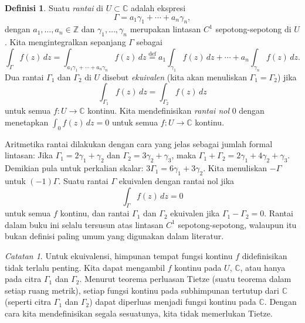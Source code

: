 \documentclass[12pt,openany]{book}
\newcommand{\C}{{\mathbb{C}}}
\newcommand{\Z}{{\mathbb{Z}}}
\newcommand{\myindex}[1]{#1\index{#1}}
\theoremstyle{plain}
\theoremstyle{remark}
\newtheorem{remark}[thm]{Catatan}
\theoremstyle{definition}
\newtheorem{defn}[thm]{Definisi}
\theoremstyle{exercise}
\theoremstyle{example}
\begin{document}
\begin{defn}
Suatu \emph{\myindex{rantai}} di $U \subset \C$ adalah ekspresi
\begin{equation*}
\Gamma = a_1 \gamma_1 + \cdots + a_n \gamma_n ,
\end{equation*}
dengan $a_1,\ldots,a_n \in \Z$ dan $\gamma_1,\ldots,\gamma_n$
merupakan lintasan $C^1$ sepotong-sepotong di $U$.  Kita mengintegralkan sepanjang $\Gamma$ sebagai
%
\begin{equation*}
\int_{\Gamma} f(z) \, dz
=
\int_{a_1 \gamma_1 + \cdots + a_n \gamma_n} f(z) \, dz
\overset{\text{def}}{=}
a_1 \int_{\gamma_1} f(z) \, dz +
\cdots
+
a_n \int_{\gamma_n} f(z) \, dz .
\end{equation*}
Dua rantai $\Gamma_1$ dan $\Gamma_2$ di
$U$ disebut
\emph{ekuivalen} (kita akan menuliskan
%
$\Gamma_1=\Gamma_2$) jika
\begin{equation*}
\int_{\Gamma_1} f(z) \, dz = 
\int_{\Gamma_2} f(z) \, dz
\end{equation*}
untuk semua $f \colon U \to \C$ kontinu.
Kita mendefinisikan \emph{\myindex{rantai nol}} $0$ dengan menetapkan
$\int_0 f(z) \, dz = 0$ untuk semua $f \colon U \to \C$ kontinu.
\end{defn}

Aritmetika rantai dilakukan dengan cara yang jelas sebagai jumlah formal lintasan:
Jika $\Gamma_1 = 2 \gamma_1 + \gamma_2$ dan $\Gamma_2 = 3 \gamma_2 +
\gamma_3$, maka $\Gamma_1 + \Gamma_2 = 2 \gamma_1 + 4 \gamma_2 + \gamma_3$.
Demikian pula untuk perkalian skalar: $3 \Gamma_1 = 6 \gamma_1 + 3 \gamma_2$.
%
Kita menuliskan $-\Gamma$ untuk $(-1)\Gamma$.
Suatu rantai $\Gamma$ ekuivalen dengan rantai nol jika
\begin{equation*}
\int_\Gamma f(z)\, dz = 0
\end{equation*}
untuk semua $f$ kontinu, dan
rantai $\Gamma_1$ dan $\Gamma_2$ ekuivalen jika $\Gamma_1 - \Gamma_2 = 0$.
Rantai dalam buku ini selalu tersusun atas lintasan $C^1$ sepotong-sepotong,
walaupun itu bukan definisi paling umum yang digunakan dalam literatur.

\begin{remark}
Untuk ekuivalensi,
himpunan tempat fungsi kontinu $f$ didefinisikan tidak terlalu penting.  Kita dapat
mengambil $f$ kontinu pada $U$, $\C$, atau hanya pada citra
$\Gamma_1$ dan $\Gamma_2$.
Menurut teorema perluasan Tietze (suatu teorema dalam setiap ruang metrik),
setiap fungsi kontinu pada subhimpunan tertutup dari
$\C$ (seperti citra $\Gamma_1$ dan $\Gamma_2$) dapat diperluas menjadi fungsi
kontinu pada $\C$.
Dengan cara kita mendefinisikan segala sesuatunya, kita tidak memerlukan Tietze.
\end{remark}
\end{document}

